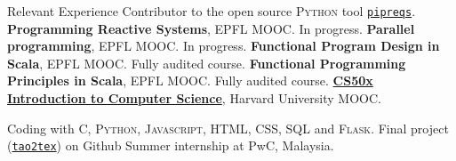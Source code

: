 \begin{rubric}{Relevant Experience}
\entry*[2023] Contributor to the open source \textsc{Python} tool \href{https://github.com/bndr/pipreqs}{\texttt{pipreqs}}.
\entry*[2023] \textbf{Programming Reactive Systems}, EPFL MOOC. In progress.
\entry*[2023] \textbf{Parallel programming}, EPFL MOOC. In progress.
\entry*[2023] \textbf{Functional Program Design in Scala}, EPFL MOOC. Fully audited course.
\entry*[2022] \textbf{Functional Programming Principles in Scala}, EPFL MOOC. Fully audited course.
\entry*[2022] \href{https://certificates.cs50.io/61d7b5aa-582d-49e7-ada4-c7cd0b965c9b.pdf?size=letter}{\textbf{CS50x Introduction to Computer Science}}, Harvard University MOOC. \par Coding with \textsc{C, Python, Javascript, HTML, CSS, SQL} and \textsc{Flask}. Final project (\href{https://github.com/clvnkhr/tao2tex}{\texttt{tao2tex}}) on Github
\entry*[2015] Summer internship at PwC, Malaysia.
%


\end{rubric}
